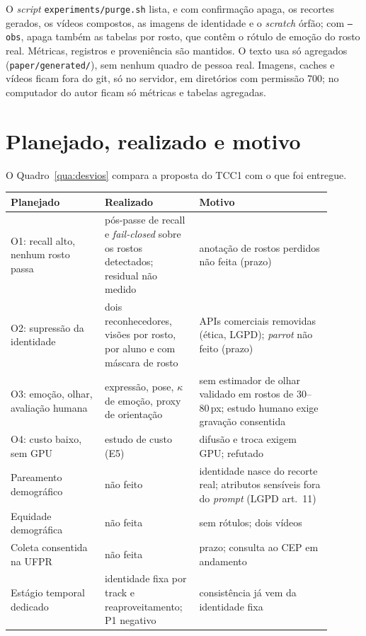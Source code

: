 O \emph{script} \texttt{experiments/purge.sh} lista, e com confirmação apaga, os recortes gerados, os vídeos compostos, as imagens de identidade e o \emph{scratch} órfão; com \texttt{--obs}, apaga também as tabelas por rosto, que contêm o rótulo de emoção do rosto real. Métricas, registros e proveniência são mantidos. O texto usa só agregados (\texttt{paper/generated/}), sem nenhum quadro de pessoa real. Imagens, caches e vídeos ficam fora do git, só no servidor, em diretórios com permissão 700; no computador do autor ficam só métricas e tabelas agregadas.

\section{Planejado, realizado e motivo}

O Quadro~\ref{qua:desvios} compara a proposta do TCC1 com o que foi entregue.

\begin{quadro}[ht]\centering
\caption{Proposta (TCC1) $\times$ entrega.}
\label{qua:desvios}
\small
\begin{tabular}{p{0.27\linewidth}p{0.25\linewidth}p{0.38\linewidth}}
\toprule
Planejado & Realizado & Motivo \\
\midrule
O1: recall alto, nenhum rosto passa & pós-passe de recall e \emph{fail-closed} sobre os rostos detectados; residual não medido & anotação de rostos perdidos não feita (prazo) \\
O2: supressão da identidade & dois reconhecedores, visões por rosto, por aluno e com máscara de rosto & APIs comerciais removidas (ética, LGPD); \emph{parrot} não feito (prazo) \\
O3: emoção, olhar, avaliação humana & expressão, pose, $\kappa$ de emoção, proxy de orientação & sem estimador de olhar validado em rostos de 30--80\,px; estudo humano exige gravação consentida \\
O4: custo baixo, sem GPU & estudo de custo (E5) & difusão e troca exigem GPU; refutado \\
Pareamento demográfico & não feito & identidade nasce do recorte real; atributos sensíveis fora do \emph{prompt} (LGPD art.~11) \\
Equidade demográfica & não feita & sem rótulos; dois vídeos \\
Coleta consentida na UFPR & não feita & prazo; consulta ao CEP em andamento \\
Estágio temporal dedicado & identidade fixa por track e reaproveitamento; P1 negativo & consistência já vem da identidade fixa \\
\bottomrule
\end{tabular}
\fonteautor
\end{quadro}
